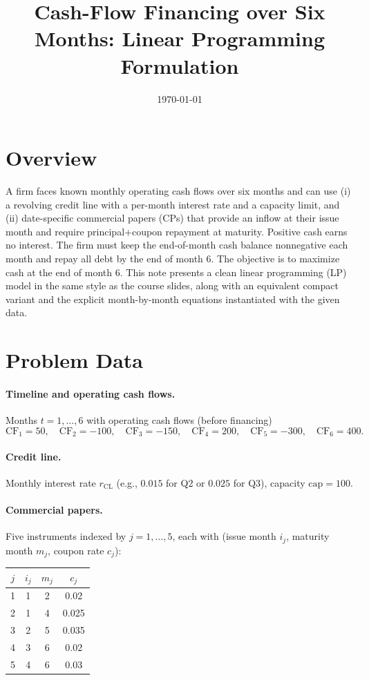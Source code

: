 \documentclass[11pt]{article}
\title{Cash-Flow Financing over Six Months: Linear Programming Formulation}
\author{}
\date{\today}
\begin{document}
\maketitle

\section*{Overview}

A firm faces known monthly operating cash flows over six months and can use (i) a revolving credit line with a per-month interest rate and a capacity limit, and (ii) date-specific commercial papers (CPs) that provide an inflow at their issue month and require principal+coupon repayment at maturity. Positive cash earns no interest. The firm must keep the end-of-month cash balance nonnegative each month and repay all debt by the end of month 6. The objective is to maximize cash at the end of month 6. This note presents a clean linear programming (LP) model in the same style as the course slides, along with an equivalent compact variant and the explicit month-by-month equations instantiated with the given data.

\section*{Problem Data}

\paragraph{Timeline and operating cash flows.} Months $t=1,\dots,6$ with operating cash flows (before financing)
\[
\mathrm{CF}_1=50,\quad \mathrm{CF}_2=-100,\quad \mathrm{CF}_3=-150,\quad \mathrm{CF}_4=200,\quad \mathrm{CF}_5=-300,\quad \mathrm{CF}_6=400.
\]

\paragraph{Credit line.} Monthly interest rate $r_{\mathrm{CL}}$ (e.g., $0.015$ for Q2 or $0.025$ for Q3), capacity $\mathrm{cap}=100$.

\paragraph{Commercial papers.} Five instruments indexed by $j=1,\dots,5$, each with (issue month $i_j$, maturity month $m_j$, coupon rate $c_j$):
\begin{center}
\begin{tabular}{@{}cccc@{}}
\toprule
$j$ & $i_j$ & $m_j$ & $c_j$ \\
\midrule
1 & 1 & 2 & 0.02 \\
2 & 1 & 4 & 0.025 \\
3 & 2 & 5 & 0.035 \\
4 & 3 & 6 & 0.02 \\
5 & 4 & 6 & 0.03 \\
\bottomrule
\end{tabular}
\end{center}
\end{document}
